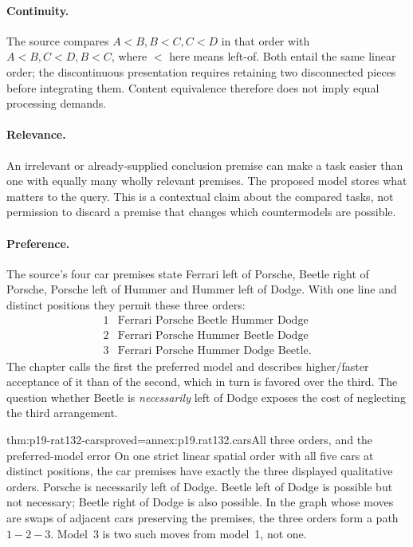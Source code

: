 \paragraph{Continuity.} The source compares \(A<B,B<C,C<D\) in
that order with \(A<B,C<D,B<C\), where \(<\) here means
left-of. Both entail the same linear order; the discontinuous presentation
requires retaining two disconnected pieces before integrating them.
Content equivalence therefore does not imply equal processing demands.

\paragraph{Relevance.} An irrelevant or already-supplied conclusion premise
can make a task easier than one with equally many wholly relevant premises.
The proposed model stores what matters to the query. This is a contextual
claim about the compared tasks, not permission to discard a premise that
changes which countermodels are possible.

\paragraph{Preference.} The source's four car premises state Ferrari left
of Porsche, Beetle right of Porsche, Porsche left of Hummer and Hummer
left of Dodge. With one line and distinct positions they permit these
three orders:
\[
\begin{array}{cl}
1&\text{Ferrari Porsche Beetle Hummer Dodge}\\
2&\text{Ferrari Porsche Hummer Beetle Dodge}\\
3&\text{Ferrari Porsche Hummer Dodge Beetle}.
\end{array}
\]
The chapter calls the first the preferred model and describes higher/faster
acceptance of it than of the second, which in turn is favored over the
third. The question whether Beetle is \emph{necessarily} left of Dodge
exposes the cost of neglecting the third arrangement.

\begin{hbtheorem}{thm:p19-rat132-cars}{proved=annex:p19.rat132.cars}{All three orders, and the preferred-model error}
On one strict linear spatial order with all five cars at distinct positions,
the car premises have exactly the three displayed qualitative orders.
Porsche is necessarily left of Dodge. Beetle left of Dodge is possible
but not necessary; Beetle right of Dodge is also possible. In the graph
whose moves are swaps of adjacent cars preserving the premises, the
three orders form a path \(1\! -\!2\! -\!3\).
Model~3 is two such moves from model~1, not one.
\end{hbtheorem}

